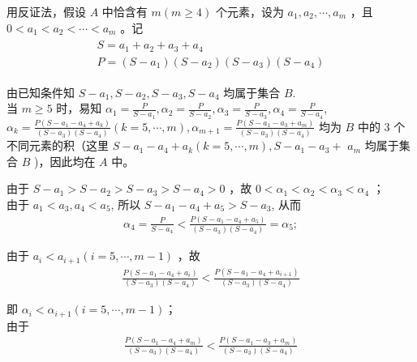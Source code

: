 \documentclass[10pt]{article}
\begin{document}
用反证法，假设 $A$ 中恰含有 $m(m \geqslant 4)$ 个元素，设为 $a_{1}, a_{2}, \cdots, a_{m}$ ，且 $0<a_{1}<a_{2}<\cdots<a_{m}$ 。记\\
\begin{align*}
\begin{gathered}
S=a_{1}+a_{2}+a_{3}+a_{4} \\
P=\left(S-a_{1}\right)\left(S-a_{2}\right)\left(S-a_{3}\right)\left(S-a_{4}\right)
\end{gathered}
\end{align*}

由已知条件知 $S-a_{1}, S-a_{2}, S-a_{3}, S-a_{4}$ 均属于集合 $B$.\\
当 $m \geqslant 5$ 时，易知 $\alpha_{1}=\frac{P}{S-a_{1}}, \alpha_{2}=\frac{P}{S-a_{2}}, \alpha_{3}=\frac{P}{S-a_{3}}, \alpha_{4}=\frac{P}{S-a_{4}}$, $\alpha_{k}=\frac{P\left(S-a_{1}-a_{4}+a_{k}\right)}{\left(S-a_{3}\right)\left(S-a_{4}\right)}(k=5, \cdots, m), \alpha_{m+1}=\frac{P\left(S-a_{1}-a_{3}+a_{m}\right)}{\left(S-a_{3}\right)\left(S-a_{4}\right)}$ 均为 $B$ 中的 3 个不同元素的积（这里 $S-a_{1}-a_{4}+a_{k}(k=5, \cdots, m), S-a_{1}-a_{3}+$ $a_{m}$ 均属于集合 $B$ )，因此均在 $A$ 中。

由于 $S-a_{1}>S-a_{2}>S-a_{3}>S-a_{4}>0$ ，故 $0<\alpha_{1}<\alpha_{2}<\alpha_{3}<\alpha_{4}$ ；\\
由于 $a_{1}<a_{3}, a_{4}<a_{5}$, 所以 $S-a_{1}-a_{4}+a_{5}>S-a_{3}$, 从而\\
\begin{align*}
\alpha_{4}=\frac{P}{S-a_{4}}<\frac{P\left(S-a_{1}-a_{4}+a_{5}\right)}{\left(S-a_{3}\right)\left(S-a_{4}\right)}=\alpha_{5} ;
\end{align*}

由于 $a_{i}<a_{i+1}(i=5, \cdots, m-1)$ ，故\\
\begin{align*}
\frac{P\left(S-a_{1}-a_{4}+a_{i}\right)}{\left(S-a_{3}\right)\left(S-a_{4}\right)}<\frac{P\left(S-a_{1}-a_{4}+a_{i+1}\right)}{\left(S-a_{3}\right)\left(S-a_{4}\right)}
\end{align*}

即 $\alpha_{i}<\alpha_{i+1}(i=5, \cdots, m-1) ；$\\
由于\\
\begin{align*}
\frac{P\left(S-a_{1}-a_{4}+a_{m}\right)}{\left(S-a_{3}\right)\left(S-a_{4}\right)}<\frac{P\left(S-a_{1}-a_{3}+a_{m}\right)}{\left(S-a_{3}\right)\left(S-a_{4}\right)}
\end{align*}
\end{document}
